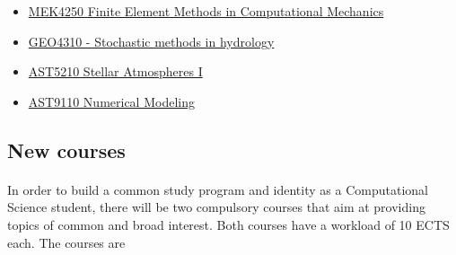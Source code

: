 \documentclass[%
oneside,                 %
final,                   %
10pt]{article}
\begin{document}
\begin{itemize}
\item \href{{http://www.uio.no/studier/emner/matnat/math/MEK4250/index-eng.html}}{MEK4250 Finite Element Methods in Computational Mechanics}

\item \href{{http://www.uio.no/studier/emner/matnat/geofag/GEO4310/}}{GEO4310 - Stochastic methods in hydrology}

\item \href{{http://www.uio.no/studier/emner/matnat/astro/AST5210/index-eng.html}}{AST5210 Stellar Atmospheres I}

\item \href{{http://www.uio.no/studier/emner/matnat/astro/AST9110/index-eng.html}}{AST9110 Numerical Modeling}
\end{itemize}

\noindent



\subsection{New courses}

\paragraph{}
In order to build a common study program and identity as a Computational Science student, there will be two compulsory courses that aim at providing topics of common and broad interest.
Both courses have a workload of 10 ECTS each. The courses are
\end{document}

